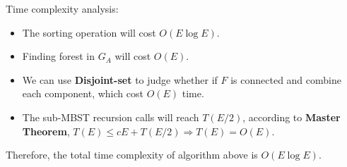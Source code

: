 \documentclass{article}
\newcommand{\<}{
    \langle}
\renewcommand{\>}{
    \rangle}
\begin{document}
{Time complexity analysis:
\begin{itemize}
    \item The sorting operation will cost $O(E\log{E})$.
    \item Finding forest in $G_A$ will cost $O(E)$.
    \item We can use \textbf{Disjoint-set} to judge whether if $F$ is connected and combine each component, which cost $O(E)$ time.
    \item The sub-MBST recursion calls will reach $T(E/2)$, according to \textbf{Master Theorem}, $T(E) \le cE + T(E/2) \Rightarrow T(E) = O(E)$.
\end{itemize}

Therefore, the total time complexity of algorithm above is $O(E\log{E})$.

} %
\end{document}
